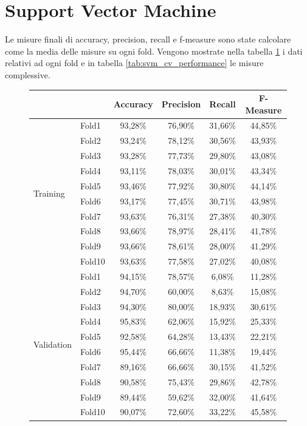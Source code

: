 \section{Support Vector Machine}

Le misure finali di accuracy, precision, recall e 
f-measure sono state calcolare come la media delle misure su ogni fold. 
Vengono mostrate nella tabella \ref{tab:svm_cv_fold_performance} i dati relativi 
ad ogni fold e in tabella \ref{tab:svm_cv_performance} le misure complessive.

\begin{figure}[H]
	\centering
	\begin{tabular}{llcccc}
		\toprule
		&& \textbf{Accuracy} & \textbf{Precision} & \textbf{Recall} & 
		\textbf{F-Measure}  \\
		\midrule
		\multirow{10}{*}{Training} & Fold1 & 93,28\% & 76,90\% & 31,66\% & 
		44,85\% \\
		& Fold2 & 93,24\%  & 78,12\% & 30,56\% & 43,93\% \\
		& Fold3 & 93,28\%  & 77,73\% & 29,80\% & 43,08\% \\
		& Fold4 & 93,11\%  & 78,03\% & 30,01\% & 43,34\% \\
		& Fold5 & 93,46\%  & 77,92\% & 30,80\% & 44,14\% \\
		& Fold6 & 93,17\%  & 77,45\% & 30,71\% & 43,98\% \\
		& Fold7 & 93,63\%  & 76,31\% & 27,38\% & 40,30\% \\
		& Fold8 & 93,66\%  & 78,97\% & 28,41\% & 41,78\% \\
		& Fold9 & 93,66\%  & 78,61\% & 28,00\% & 41,29\% \\
		& Fold10 & 93,63\% & 77,58\% & 27,02\% & 40,08\%  \\
		\midrule
		\multirow{10}{*}{Validation} & Fold1 & 94,15\% & 78,57\% & 6,08\% & 
		11,28\% \\
		& Fold2 & 94,70\% & 60,00\% & 8,63\% & 15,08\% \\
		& Fold3 & 94,30\% & 80,00\% & 18,93\% & 30,61\% \\
		& Fold4 & 95,83\% & 62,06\% & 15,92\% & 25,33\% \\
		& Fold5 & 92,58\% & 64,28\% & 13,43\% & 22,21\% \\
		& Fold6 & 95,44\% & 66,66\% & 11,38\% & 19,44\% \\
		& Fold7 & 89,16\% & 66,66\% & 30,15\% & 41,52\% \\
		& Fold8 & 90,58\% & 75,43\% & 29,86\% & 42,78\% \\
		& Fold9 & 89,44\% & 59,62\% & 32,00\% & 41,64\% \\
		& Fold10 & 90,07\% & 72,60\% & 33,22\% & 45,58\% \\
		\bottomrule 
	\end{tabular}
	\label{tab:svm_cv_fold_performance}
\end{figure}

